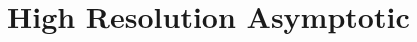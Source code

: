 \documentclass[journal, twocolumn, 10pt]{IEEEtran}
\newcommand{\cW}{{\mathcal{W}}}
\newcommand{\rvs}{{\mathssf{s}}}    %
\newcommand{\rvu}{{\mathssf{u}}}    %
\newcommand{\rvbu}{{\mathbsf{u}}}
\newcommand{\rvz}{{\mathssf{z}}}    %
\begin{document}
{%




\section{High Resolution Asymptotic}
\label{sec:HR}

}
\end{document}
